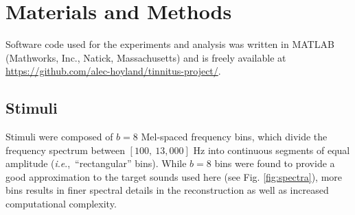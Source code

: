 \documentclass[journal]{IEEEtran}
\newcommand{\ie}{\textit{i}.\textit{e}.,\ }
\begin{document}
% 
% 
% 
% 


\section{Materials and Methods }

Software code used for the experiments and analysis was written in MATLAB (Mathworks, Inc., Natick, Massachusetts)
and is freely available at \protect\url{https://github.com/alec-hoyland/tinnitus-project/}.

\subsection{Stimuli}

Stimuli were composed of $b=8$ Mel-spaced frequency bins,
which divide the frequency spectrum between $[100,~13,000]$
Hz into continuous segments of equal amplitude (\ie ``rectangular'' bins).
While $b=8$ bins were found to provide a good approximation to the target sounds used here (see Fig. \ref{fig:spectra}),
more bins results in finer spectral details in the reconstruction as well as increased computational complexity.
\end{document}
